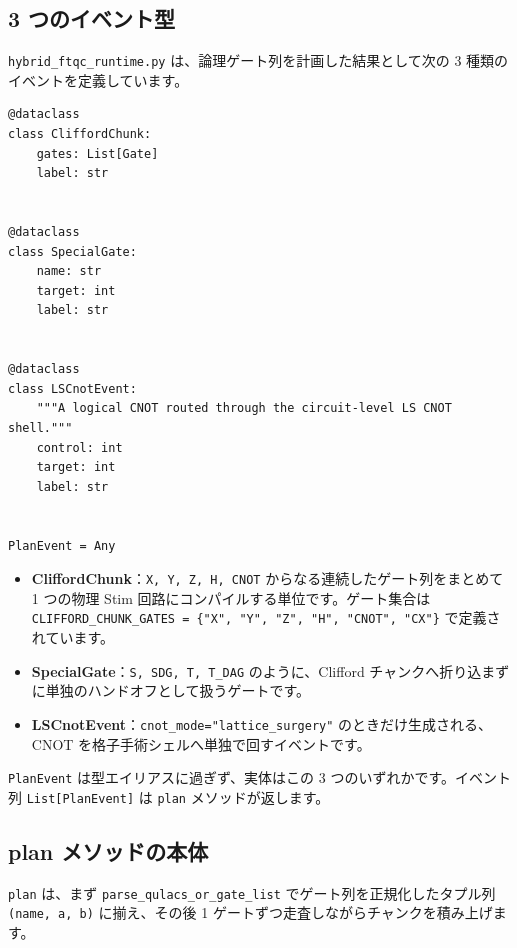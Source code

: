 \subsection{3 つのイベント型}

\texttt{hybrid\_ftqc\_runtime.py} は、論理ゲート列を計画した結果として次の 3 種類のイベントを定義しています。

\begin{lstlisting}[caption={イベント型の定義（src/ftqc/hybrid\_ftqc\_runtime.py）}]
@dataclass
class CliffordChunk:
    gates: List[Gate]
    label: str


@dataclass
class SpecialGate:
    name: str
    target: int
    label: str


@dataclass
class LSCnotEvent:
    """A logical CNOT routed through the circuit-level LS CNOT shell."""
    control: int
    target: int
    label: str


PlanEvent = Any
\end{lstlisting}

\begin{itemize}
  \item \textbf{CliffordChunk}：\texttt{X, Y, Z, H, CNOT} からなる連続したゲート列をまとめて 1 つの物理 Stim 回路にコンパイルする単位です。ゲート集合は \texttt{CLIFFORD\_CHUNK\_GATES = \{"X", "Y", "Z", "H", "CNOT", "CX"\}} で定義されています。
  \item \textbf{SpecialGate}：\texttt{S, SDG, T, T\_DAG} のように、Clifford チャンクへ折り込まずに単独のハンドオフとして扱うゲートです。
  \item \textbf{LSCnotEvent}：\texttt{cnot\_mode="lattice\_surgery"} のときだけ生成される、CNOT を格子手術シェルへ単独で回すイベントです。
\end{itemize}

\texttt{PlanEvent} は型エイリアスに過ぎず、実体はこの 3 つのいずれかです。イベント列 \texttt{List[PlanEvent]} は \texttt{plan} メソッドが返します。

\subsection{plan メソッドの本体}

\texttt{plan} は、まず \texttt{parse\_qulacs\_or\_gate\_list} でゲート列を正規化したタプル列 \texttt{(name, a, b)} に揃え、その後 1 ゲートずつ走査しながらチャンクを積み上げます。

